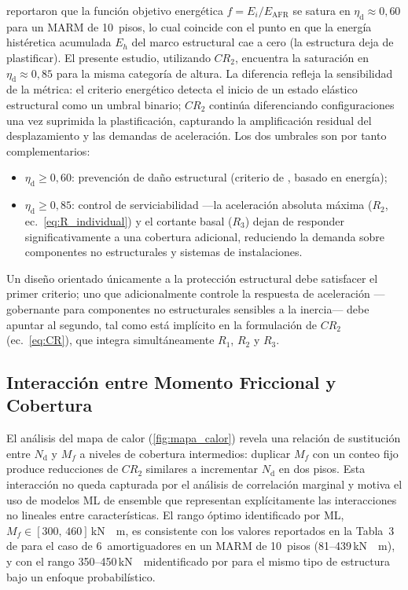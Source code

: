 \documentclass[preprint,12pt,authoryear]{elsarticle}
\newcommand{\nd}{N_{\mathrm{d}}}
\newcommand{\etad}{\eta_{\mathrm{d}}}
\newcommand{\Mf}{M_{\!f}}
\newcommand{\KM}{\,\si{kN{\cdot}m}}
\begin{document}
\citet{Jarrahi2020sdee} reportaron que la función objetivo energética
$f = E_i / E_{\mathrm{AFR}}$ se satura en $\etad \approx 0{,}60$ para un
MARM de 10~pisos, lo cual coincide con el punto en que la energía histéretica
acumulada $E_h$ del marco estructural cae a cero (la estructura deja de
plastificar). El presente estudio, utilizando $CR_2$, encuentra la saturación
en $\etad \approx 0{,}85$ para la misma categoría de altura. La diferencia
refleja la sensibilidad de la métrica: el criterio energético detecta el inicio
de un estado elástico estructural como un umbral binario; $CR_2$ continúa
diferenciando configuraciones una vez suprimida la plastificación, capturando
la amplificación residual del desplazamiento y las demandas de aceleración.
Los dos umbrales son por tanto complementarios:
\begin{itemize}
    \item $\etad \geq 0{,}60$: prevención de daño estructural (criterio de
          \citealt{Jarrahi2020sdee}, basado en energía);
    \item $\etad \geq 0{,}85$: control de serviciabilidad ---la aceleración
          absoluta máxima ($R_2$, ec.~\ref{eq:R_individual}) y el cortante
          basal ($R_3$) dejan de responder significativamente a una cobertura
          adicional, reduciendo la demanda sobre componentes no estructurales
          y sistemas de instalaciones.
\end{itemize}
Un diseño orientado únicamente a la protección estructural debe satisfacer el
primer criterio; uno que adicionalmente controle la respuesta de aceleración
---gobernante para componentes no estructurales sensibles a la inercia---
debe apuntar al segundo, tal como está implícito en la formulación de $CR_2$
(ec.~\ref{eq:CR}), que integra simultáneamente $R_1$, $R_2$ y $R_3$.

\subsection{Interacción entre Momento Friccional y Cobertura}

El análisis del mapa de calor (\cref{fig:mapa_calor}) revela una relación de
sustitución entre $\nd$ y $\Mf$ a niveles de cobertura intermedios: duplicar
$\Mf$ con un conteo fijo produce reducciones de $CR_2$ similares a incrementar
$\nd$ en dos pisos. Esta interacción no queda capturada por el análisis de
correlación marginal y motiva el uso de modelos ML de ensemble que representan
explícitamente las interacciones no lineales entre características. El rango óptimo identificado por ML, $\Mf \in [300,\,460]$\KM, es consistente
con los valores reportados en la Tabla~3 de \citet{Jarrahi2020sdee} para el
caso de 6~amortiguadores en un MARM de 10~pisos (81--439\KM), y con el rango
350--450\KM identificado por \citet{Ponce2026} para el mismo tipo de
estructura bajo un enfoque probabilístico.
\end{document}
